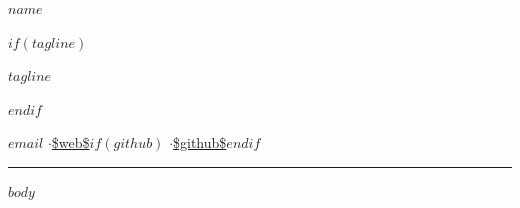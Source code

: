 \documentclass[11pt,a4paper]{article}
\begin{document}
\begingroup
  {\headingfont\color{bodytext}\fontsize{30}{32}\selectfont $name$\par}
  \vspace{2pt}
  $if(tagline)$
    {\headingfont\itshape\color{accent}\fontsize{12}{14}\selectfont $tagline$\par}
    \vspace{4pt}
  $endif$
  {\color{secondary}\fontsize{9}{11}\selectfont
    $email$ \enspace\ensuremath{\cdot}\enspace \url{$web$}$if(github)$ \enspace\ensuremath{\cdot}\enspace \url{$github$}$endif$\par}
  \vspace{8pt}
  {\color{accent}\rule{\linewidth}{2pt}\par}
  \vspace{8pt}
\endgroup

$body$
\end{document}
